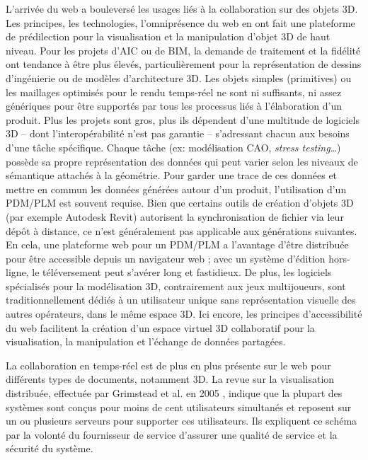 L'arrivée du web a bouleversé les usages liés à la collaboration sur des objets 3D. 
Les principes, les technologies, l'omniprésence du web en ont fait une plateforme 
de prédilection pour la visualisation et la manipulation d'objet 3D de haut niveau.   
Pour les projets d'\gls{AIC} ou de \gls{BIM}, la demande de traitement et la fidélité 
ont tendance à être plus élevés, particulièrement pour la représentation de dessins 
d'ingénierie ou de modèles d'architecture 3D. 
Les objets simples (primitives) ou les maillages optimisés pour le rendu temps-réel 
ne sont ni suffisants, ni assez génériques pour être supportés par tous les 
processus liés à l'élaboration d'un produit. 
Plus les projets sont gros, plus ils dépendent d'une multitude de logiciels 3D --  
dont l'interopérabilité n'est pas garantie -- s'adressant chacun aux besoins d'une 
tâche spécifique. 
Chaque tâche (ex: modélisation \gls{CAO}, \textit{stress testing}\ldots) possède sa 
propre représentation des données qui peut varier selon les niveaux de 
sémantique attachés à la géométrie. 
Pour garder une trace de ces données et mettre en commun les données 
générées autour d'un produit, l'utilisation d'un \gls{PDM}/\gls{PLM} est 
souvent requise. Bien que certains outils de création d'objets 3D (par exemple 
Autodesk Revit) autorisent la synchronisation de fichier via leur dépôt à distance, 
ce n'est généralement pas applicable aux générations suivantes. 
En cela, une plateforme web pour un \gls{PDM}/\gls{PLM} a 
l'avantage d'être distribuée pour être accessible depuis un navigateur web ; avec 
un système d'édition hors-ligne, le téléversement peut s'avérer long et fastidieux.
De plus, les logiciels spécialisés pour la modélisation 3D, contrairement aux jeux 
multijoueurs, sont traditionnellement dédiés à un utilisateur unique sans 
représentation visuelle des autres opérateurs, dans le même espace 3D. 
Ici encore, les principes d'accessibilité du web facilitent la création d'un espace 
virtuel 3D collaboratif pour la visualisation, la manipulation et l'échange de
données partagées. 


La collaboration en temps-réel est de plus en plus présente sur le web pour 
différents types de documents, notamment 3D.
La revue sur la visualisation distribuée, effectuée par Grimstead et al. en 2005 
\cite{Grimstead2005}, indique que la plupart des systèmes sont conçus pour 
moins de cent 
utilisateurs simultanés et reposent sur un ou plusieurs serveurs pour supporter ces 
utilisateurs. 
Ils expliquent ce schéma par la volonté du fournisseur de service d'assurer une 
qualité de service et la sécurité du système. 

